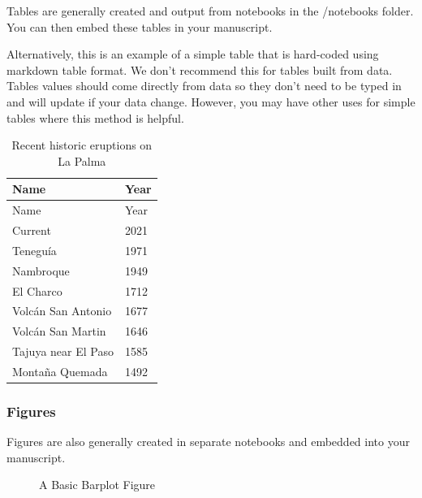 \documentclass[
]{agujournal2019}
\begin{document}
Tables are generally created and output from notebooks in the /notebooks
folder. You can then embed these tables in your manuscript.

Alternatively, this is an example of a simple table that is hard-coded
using markdown table format. We don't recommend this for tables built
from data. Tables values should come directly from data so they don't
need to be typed in and will update if your data change. However, you
may have other uses for simple tables where this method is helpful.

\begin{longtable}[]{@{}ll@{}}
\caption{Recent historic eruptions on La
Palma}\label{tbl-history}\tabularnewline
\toprule\noalign{}
Name & Year \\
\midrule\noalign{}
\endfirsthead
\toprule\noalign{}
Name & Year \\
\midrule\noalign{}
\endhead
\bottomrule\noalign{}
\endlastfoot
Current & 2021 \\
Teneguía & 1971 \\
Nambroque & 1949 \\
El Charco & 1712 \\
Volcán San Antonio & 1677 \\
Volcán San Martin & 1646 \\
Tajuya near El Paso & 1585 \\
Montaña Quemada & 1492 \\
\end{longtable}

\subsubsection{Figures}\label{figures}

Figures are also generally created in separate notebooks and embedded
into your manuscript.

\begin{figure}[H]


\caption{\label{fig-1}A Basic Barplot Figure}

\end{figure}%
\end{document}
